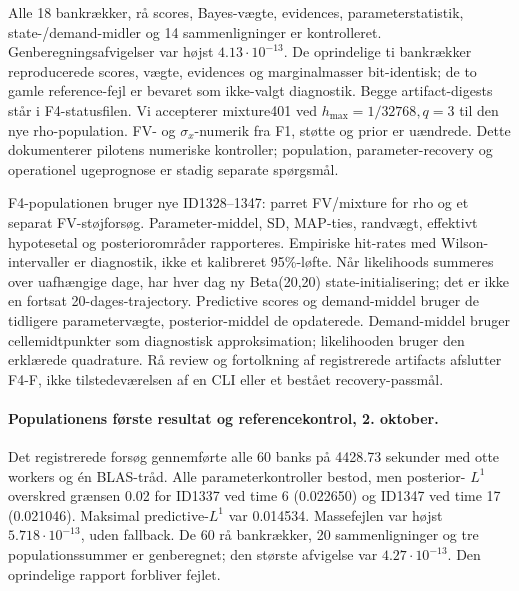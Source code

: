 Alle 18 bankrækker, rå scores, Bayes-vægte, evidences, parameterstatistik,
state-/demand-midler og 14 sammenligninger er kontrolleret.
Genberegningsafvigelser var højst \(4.13\cdot10^{-13}\).
De oprindelige ti bankrækker reproducerede scores, vægte, evidences og
marginalmasser bit-identisk; de to gamle reference-fejl er bevaret som
ikke-valgt diagnostik. Begge artifact-digests står i F4-statusfilen.
Vi accepterer mixture401 ved \(h_{\max}=1/32768,q=3\) til den nye
rho-population. FV- og \(\sigma_x\)-numerik fra F1, støtte og prior er uændrede.
Dette dokumenterer pilotens numeriske kontroller; population, parameter-recovery
og operationel ugeprognose er stadig separate spørgsmål.

F4-populationen bruger nye ID1328--1347: parret FV/mixture for rho og et
separat FV-støjforsøg. Parameter-middel, SD, MAP-ties, randvægt, effektivt
hypotesetal og posteriorområder rapporteres. Empiriske hit-rates med
Wilson-intervaller er diagnostik, ikke et kalibreret 95\%-løfte. Når
likelihoods summeres over uafhængige dage, har hver dag ny Beta(20,20)
state-initialisering; det er ikke en fortsat 20-dages-trajectory.
Predictive scores og demand-middel bruger de tidligere parametervægte,
posterior-middel de opdaterede. Demand-middel bruger cellemidtpunkter som
diagnostisk approksimation; likelihooden bruger den erklærede quadrature.
Rå review og fortolkning af registrerede artifacts afslutter F4-F,
ikke tilstedeværelsen af en CLI eller et bestået recovery-passmål.

\paragraph{Populationens første resultat og referencekontrol, 2. oktober.}
Det registrerede forsøg gennemførte alle 60 banks på 4428.73 sekunder med
otte workers og én BLAS-tråd. Alle parameterkontroller bestod, men posterior-
\(L^1\) overskred grænsen 0.02 for ID1337 ved time 6 (0.022650) og ID1347
ved time 17 (0.021046). Maksimal predictive-\(L^1\) var 0.014534.
Massefejlen var højst \(5.718\cdot10^{-13}\), uden fallback.
De 60 rå bankrækker, 20 sammenligninger og tre populationssummer er
genberegnet; den største afvigelse var \(4.27\cdot10^{-13}\).
Den oprindelige rapport forbliver fejlet.

